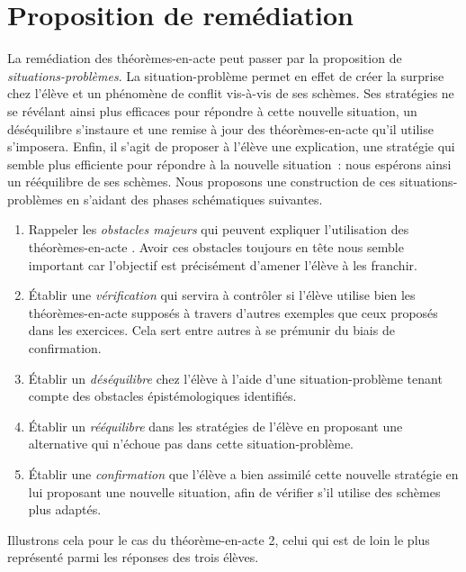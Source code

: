 \documentclass{report}
\theoremstyle{definition}
\newcommand{\ta}{théorème-en-acte }
\newcommand{\tas}{théorèmes-en-acte }
\begin{document}
\section*{Proposition de remédiation}

La remédiation des \tas peut passer par la proposition de \textit{situations-problèmes}. La situation-problème permet en effet de créer la surprise chez l'élève et un phénomène de conflit vis-à-vis de ses schèmes. Ses stratégies ne se révélant ainsi plus efficaces pour répondre à cette nouvelle situation, un déséquilibre s'instaure et une remise à jour des \tas qu'il utilise s'imposera. Enfin, il s'agit de proposer à l'élève une explication, une stratégie qui semble plus efficiente pour répondre à la nouvelle situation~: nous espérons ainsi un rééquilibre de ses schèmes. Nous proposons une construction de ces situations-problèmes en s'aidant des phases schématiques suivantes.

\begin{enumerate}
\item Rappeler les \textit{obstacles majeurs} qui peuvent expliquer l'utilisation des \tas. Avoir ces obstacles toujours en tête nous semble important car l'objectif est précisément d'amener l'élève à les franchir.
\item Établir une \textit{vérification} qui servira à contrôler si l'élève utilise bien les \tas supposés à travers d'autres exemples que ceux proposés dans les exercices. Cela sert entre autres à se prémunir du biais de confirmation.
\item Établir un \textit{déséquilibre} chez l'élève à l'aide d'une situation-problème tenant compte des obstacles épistémologiques identifiés.
\item Établir un \textit{rééquilibre} dans les stratégies de l'élève en proposant une alternative qui n'échoue pas dans cette situation-problème.
\item Établir une \textit{confirmation} que l'élève a bien assimilé cette nouvelle stratégie en lui proposant une nouvelle situation, afin de vérifier s'il utilise des schèmes plus adaptés.
\end{enumerate}

Illustrons cela pour le cas du \ta 2, celui qui est de loin le plus représenté parmi les réponses des trois élèves.
\end{document}
